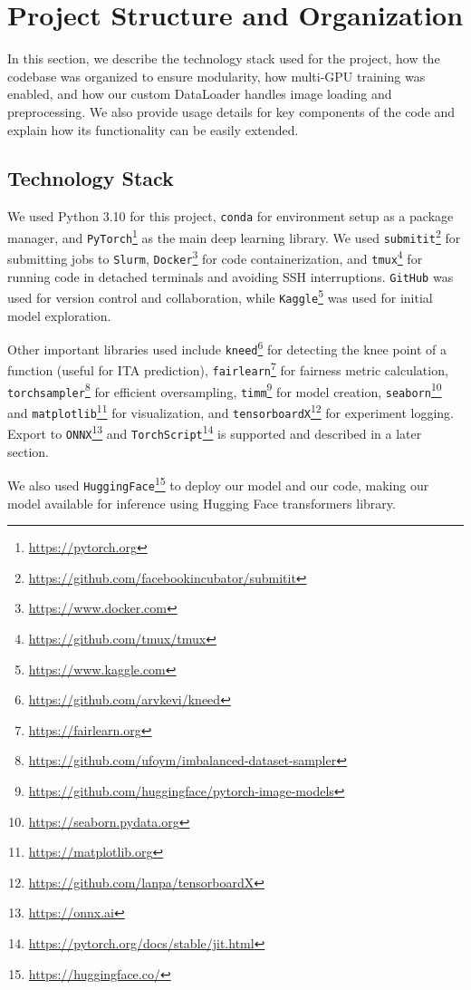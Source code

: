 \chapter{Project Structure and Organization}
\label{ch:project_org} %
In this section, we describe the technology stack used for the project, how the codebase was organized to ensure modularity, how multi-GPU training was enabled, and how our custom DataLoader handles image loading and preprocessing. We also provide usage details for key components of the code and explain how its functionality can be easily extended.

\section{Technology Stack}

We used Python 3.10 for this project, \texttt{conda} for environment setup as a package manager, and \texttt{PyTorch}\footnote{\url{https://pytorch.org}} as the main deep learning library. We used \texttt{submitit}\footnote{\url{https://github.com/facebookincubator/submitit}} for submitting jobs to \texttt{Slurm}, \texttt{Docker}\footnote{\url{https://www.docker.com}} for code containerization, and \texttt{tmux}\footnote{\url{https://github.com/tmux/tmux}} for running code in detached terminals and avoiding SSH interruptions. \texttt{GitHub} was used for version control and collaboration, while \texttt{Kaggle}\footnote{\url{https://www.kaggle.com}} was used for initial model exploration.

Other important libraries used include \texttt{kneed}\footnote{\url{https://github.com/arvkevi/kneed}} for detecting the knee point of a function (useful for ITA prediction), \texttt{fairlearn}\footnote{\url{https://fairlearn.org}} for fairness metric calculation, \texttt{torchsampler}\footnote{\url{https://github.com/ufoym/imbalanced-dataset-sampler}} for efficient oversampling, \texttt{timm}\footnote{\url{https://github.com/huggingface/pytorch-image-models}} for model creation, \texttt{seaborn}\footnote{\url{https://seaborn.pydata.org}} and \texttt{matplotlib}\footnote{\url{https://matplotlib.org}} for visualization, and \texttt{tensorboardX}\footnote{\url{https://github.com/lanpa/tensorboardX}} for experiment logging. Export to \texttt{ONNX}\footnote{\url{https://onnx.ai}} and \texttt{TorchScript}\footnote{\url{https://pytorch.org/docs/stable/jit.html}} is supported and described in a later section.

We also used \texttt{HuggingFace}\footnote{\url{https://huggingface.co/}} to deploy our model and our code, making our model available for inference using Hugging Face transformers library.

